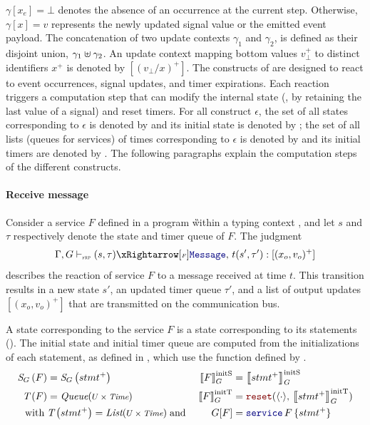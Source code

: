$\gamma[x_e] = \bot$ denotes the absence of an occurrence at the current step. Otherwise,
$\gamma[x] = v$ represents the newly updated signal value or the emitted event payload.
%
The concatenation of two update contexts $\gamma_1$ and $\gamma_2$, is defined as their disjoint
union, $\gamma_1 \uplus \gamma_2$. An update context mapping bottom values $v_\bot^+$ to
distinct identifiers $x^+$ is denoted by $[(v_\bot/x)^+]$.
%
The constructs of \GRFRP are designed to react to event occurrences, signal updates, and timer
expirations. Each reaction triggers a computation step that can modify the internal state (\eg, by
retaining the last value of a signal) and reset timers.
%
For all \GRFRP construct $\epsilon$, the set of all states corresponding to $\epsilon$ is denoted by
\stateTy{\epsilon} and its initial state is denoted by \initstate{\epsilon}; the set of all lists
(queues for services) of times corresponding to $\epsilon$ is denoted by \timerTy{\epsilon} and its
initial timers are denoted by \inittimer{\epsilon}. The following paragraphs explain the computation
steps of the different constructs.

\paragraph{Receive message}

Consider a service $F$ defined in a program \G within a typing context \tyCtx, and let $s$ and
$\tau$ respectively denote the state and timer queue of $F$. The judgment
\begin{equation*}
    \serviceOpSem{s}{\tau}{F}{\mess}{t}{s'}{\tau'}{(x_o, v_o)^+}
\end{equation*}
describes the reaction of service $F$ to a message \mess received at time $t$. This transition
results in a new state $s'$, an updated timer queue $\tau'$, and a list of output updates
$[(x_o, v_o)^+]$ that are transmitted on the communication bus.

A state corresponding to the service $F$ is a state corresponding to its statements
().
The initial state  and initial timer queue
 are computed from the initializations of each statement, as defined
in ,
which use the function  defined by .
\begin{align}
    \stateTy{F}    & = \stateTy{stmt^+}                                        & \initstate{F} & = \initstate{stmt^+} \label{eq:semantics:grfrp:opsem:init:service:state}                       \\
    \timerTy{F}    & = \Queue{U \times \Time}                                  & \inittimer{F} & = \reset{\emptytimer}{\inittimer{stmt^+}}  \label{eq:semantics:grfrp:opsem:init:service:timer} \\
    \text{with} \; & \timerTy{stmt^+} = \List{U \times \Time} \; \text{and} \; & \G[F]         & = \service{F}{stmt^+} \nonumber
\end{align}

